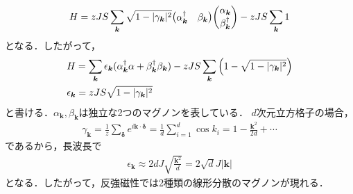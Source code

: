 \documentclass[\main/main.tex]{subfiles}
\begin{document}
\begin{frame}
    \begin{align}
        H 
        = zJS \sum_{\bm{k}} \sqrt{1-|\gamma_{\bm{k}}|^2}\mqty(\alpha_{\bm{k}}^\dagger & \beta_{\bm{k}})
        \mqty(\alpha_{\bm{k}}\\\beta_{\bm{k}}^\dagger)
        -zJS \sum_{\bm{k}} 1
    \end{align}
    となる．したがって，
    \begin{align}
        &
        H = \sum_{\bm{k}}\epsilon_{\bm{k}}(\alpha_{\bm{k}}^\dagger \alpha + \beta_{\bm{k}}^\dagger \beta_{\bm{k}})
        -
        zJS \sum_{\bm{k}}\qty(1 - \sqrt{1-|\gamma_{\bm{k}}|^2})
        \\ &
        \epsilon_{\bm{k}} = zJS \sqrt{1-|\gamma_{\bm{k}}|^2}
    \end{align}
    と書ける．$\alpha_{\bm{k}},\beta_{\bm{k}}$は独立な2つのマグノンを表している．
    $d$次元立方格子の場合，
    \begin{align}
        \gamma_{\bm{k}}
        = \frac{1}{z}\sum_{\bm{\delta}} e^{i \bm{k} \cdot \bm{\delta}}
        = \frac{1}{d} \sum_{i=1}^d \cos k_i 
        = 1 - \frac{\bm{k}^2}{2d} + \cdots
    \end{align}
    であるから，長波長で
    \begin{align}
        \epsilon_{\bm{k}} \approx 2dJ \sqrt{\frac{\bm{k}^2}{d}}
        = 2\sqrt{d}J|\bm{k}|
    \end{align}
    となる．したがって，反強磁性では\alert{2種類}の\alert{線形分散}のマグノンが現れる．
\end{frame}
\end{document}
